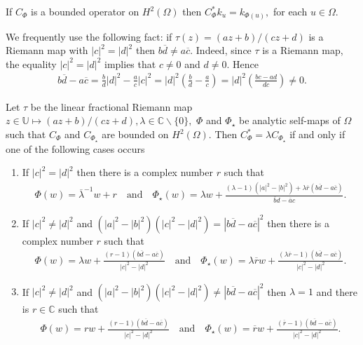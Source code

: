 \documentclass[10pt,a4paper]{amsart}
\begin{document}
\begin{cor}
\label{023} If $C_{\Phi}$ is a bounded operator on $H^2(\Omega)$ then $C_{\Phi}^{*}k_{u}=k_{\Phi(u)},$ for
each $u\in\Omega.$
\end{cor}

\begin{rem}
\label{078} We frequently use the following fact: if $\tau(z)=(az+b)/(cz+d)$
is a Riemann map with $|c|^{2}=|d|^{2}$ then $b\overline{d}\neq a\overline
{c}.$ Indeed, since $\tau$ is a Riemann map, the equality $|c|^{2}=|d|^{2}$
implies that $c\neq0$ and $d\neq0.$ Hence
\begin{align*}
b\overline{d}-a\overline{c}=\frac{b}{d}|d|^{2}-\frac{a}{c}|c|^{2}%
=|d|^{2}\left(  \frac{b}{d}-\frac{a}{c}\right)  =|d|^{2}\left(  \frac
{bc-ad}{dc}\right)  \neq0.
\end{align*}
\end{rem}

\begin{thm}
\label{038} Let $\tau$ be the linear fractional Riemann map $z\in \mathbb{U} \mapsto (az+b)/(cz+d),\lambda \in \mathbb{C}\backslash\{0\},$ $\Phi$ and $\Phi_{\star}$ be analytic self-maps of $\Omega$
such that $C_{\Phi}$ and $C_{\Phi_{\star}}$ are bounded on $H^{2}(\Omega).$ Then
$C_{\Phi}^{\ast}=\lambda C_{\Phi_{\star}}$ if and only if one of the following cases occurs

\begin{enumerate}
\item If $|c|^{2}=|d|^{2}$ then there is a complex number $r$ such that
\begin{align}\label{035}
\Phi(w)=\overline{\lambda}^{-1}w+r\quad\text{and}\quad\Phi_{\star}(w)=\lambda
w+\frac{(\lambda-1)(|a|^{2}-|b|^{2})+\lambda\overline{r}(b\overline
{d}-a\overline{c})}{\overline{b}d-\overline{a}c}.
\end{align}


\item If $|c|^{2}\neq|d|^{2}$ and $(|a|^{2}-|b|^{2})(|c|^{2}-|d|^{2}%
)=|b\overline{d}-a\overline{c}|^{2}$ then there is a complex number $r$ such
that%
\begin{align}\label{036}
\Phi(w)=\lambda w+\frac{(r-1)(b\overline{d}-a\overline{c})}{|c|^{2}-|d|^{2}}%
\quad\text{and}\quad\Phi_{\star}(w)=\lambda \overline{r}w+\frac{(\lambda
\overline{r}-1)(b\overline{d}-a\overline{c})}{|c|^{2}-|d|^{2}}.
\end{align}


\item If $|c|^{2}\neq|d|^{2}$ and $(|a|^{2}-|b|^{2})(|c|^{2}-|d|^{2}%
)\neq|b\overline{d}-a\overline{c}|^{2}$ then $\lambda=1$ and there is
$r\in\mathbb{C}$ such that%
\begin{align}\label{043}
\Phi(w)=rw+\frac{(r-1)(b\overline{d}-a\overline{c})}{|c|^{2}-|d|^{2}}%
\quad\text{and}\quad\Phi_{\star}(w)=\overline{r}w+\frac{(\overline
{r}-1)(b\overline{d}-a\overline{c})}{|c|^{2}-|d|^{2}}.
\end{align}

\end{enumerate}
\end{thm}
\end{document}
